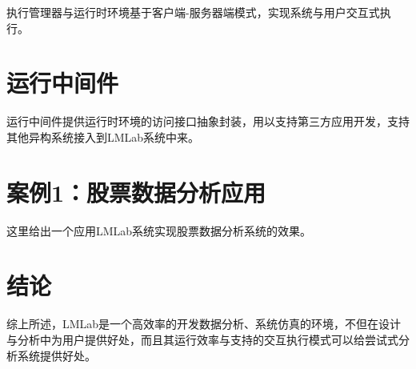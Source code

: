 \documentclass[UTF8, 10pt, a4paper]{ctexart}
\begin{document}
执行管理器与运行时环境基于客户端-服务器端模式，实现系统与用户交互式执行。

\section{运行中间件}

运行中间件提供运行时环境的访问接口抽象封装，用以支持第三方应用开发，支持其他异构系统接入到LMLab系统中来。

\section{案例1：股票数据分析应用}

这里给出一个应用LMLab系统实现股票数据分析系统的效果。

\section{结论}

综上所述，LMLab是一个高效率的开发数据分析、系统仿真的环境，不但在设计与分析中为用户提供好处，而且其运行效率与支持的交互执行模式可以给尝试式分析系统提供好处。
\end{document}
